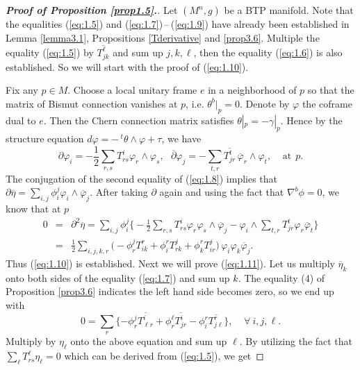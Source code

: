 \documentclass[10pt,a4paper]{amsart}
\begin{document}
\begin{proof}[{\bf Proof of Proposition \ref{prop1.5}.}]
Let $(M^n,g)$ be a BTP manifold. Note that the equalities (\ref{eq:1.5}) and (\ref{eq:1.7})\,--\,(\ref{eq:1.9})
have already been established in Lemma \ref{lemma3.1}, Propositions \ref{Tderivative} and \ref{prop3.6}.
Multiple the equality (\ref{eq:1.5}) by $\overline{T_{jk}^\ell}$ and sum up $j,k,\ell$, then the equality (\ref{eq:1.6}) is also established.
So we will start with the proof of (\ref{eq:1.10}).

Fix any $p\in M$. Choose a local unitary frame $e$ in a neighborhood of $p$
so that the matrix of Bismut connection vanishes at $p$, i.e. $\theta^b|_p=0$.
Denote by $\varphi$ the coframe dual to $e$. Then the Chern connection matrix satisfies $\theta|_p=-\gamma|_p$.
Hence by the structure equation
$ d\varphi = - \,^t\!\theta \wedge \varphi +\tau$, we have
$$ \partial \varphi_i = -\frac{1}{2}\sum_{r,s}T^i_{rs}\varphi_r \wedge \varphi_s, \ \ \ \overline{\partial}\varphi_j = - \sum_{t,r} \overline{T^t_{jr}} \, \overline{\varphi}_r \wedge \varphi_t, \ \ \ \ \ \mbox{at} \ \ p. $$
The conjugation of the second equality of (\ref{eq:1.8}) implies that $\partial \overline{\eta} = \sum_{i,j} \phi^j_i \varphi_i \wedge \overline{\varphi}_j$. After taking $\partial $ again and using the fact that $\nabla^b\phi =0$, we know that at $p$
\begin{eqnarray*}
 0 & = &  \partial^2\overline{\eta} = \sum_{i,j} \phi^j_i \big\{ -\frac{1}{2}\sum_{r,s} T^i_{rs} \varphi_r\varphi_s \wedge \overline{\varphi}_j - \varphi_i \wedge  \sum_{t,r} T^t_{jr} \varphi_r \overline{\varphi}_t \big\} \\
 & = & \frac{1}{2} \sum_{i,j,k,r} \big( - \phi^j_r T^r_{ik} + \phi^r_i T^j_{rk} + \phi^r_k T^j_{ir} \big) \,\varphi_i\varphi_k\overline{\varphi}_j .
\end{eqnarray*}
Thus (\ref{eq:1.10}) is established. Next we will prove (\ref{eq:1.11}).
Let us multiply $\overline{\eta}_k$ onto both sides of the equality (\ref{eq:1.7}) and sum up $k$.
The equality (4) of Proposition \ref{prop3.6} indicates the left hand side becomes zero, so we end up with
\begin{equation} \label{eq:4.1}
 0 = \sum_r \{ -\phi^j_r \overline{T^i_{\ell r}} + \phi^{\ell }_r \overline{T^i_{j r}}  - \phi^r_i \overline{T^r_{j\ell }}  \} , \ \ \ \ \ \forall \ i,j,\ell.
 \end{equation}
Multiply by $\eta_{\ell}$ onto the above equation and sum up $\ell$.
By utilizing the fact that $\sum_{\ell} T^{\ell}_{rs}\eta_{\ell} =0$ which can be derived from (\ref{eq:1.5}), we get

\end{proof}
\end{document}
